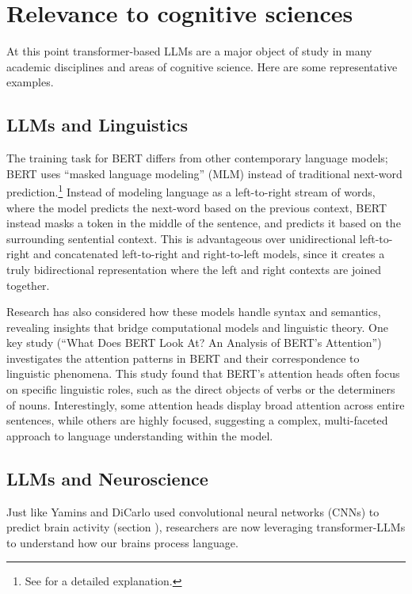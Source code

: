 \section{Relevance to cognitive sciences}\label{sect_bert}

At this point transformer-based LLMs are a major object of study in many academic disciplines and areas of cognitive science. Here are some representative examples.

\subsection{LLMs and Linguistics}

The training task for BERT differs from other contemporary language models; BERT uses ``masked language modeling'' (MLM) instead of traditional next-word prediction.\footnote{See \cite{devlin2018bert} for a detailed explanation.} Instead of modeling language as a left-to-right stream of words, where the model predicts the next-word based on the previous context, BERT instead masks a token in the middle of the sentence, and predicts it based on the surrounding sentential context. This is advantageous over unidirectional left-to-right and concatenated left-to-right and right-to-left models, since it creates a truly bidirectional representation where the left and right contexts are joined together.

Research has also considered how these models handle syntax and semantics, revealing insights that bridge computational models and linguistic theory. One key study (``What Does BERT Look At? An Analysis of BERT's Attention'') investigates the attention patterns in BERT and their correspondence to linguistic phenomena. This study found that BERT's attention heads often focus on specific linguistic roles, such as the direct objects of verbs or the determiners of nouns. Interestingly, some attention heads display broad attention across entire sentences, while others are highly focused, suggesting a complex, multi-faceted approach to language understanding within the model. 

\subsection{LLMs and Neuroscience}

Just like Yamins and DiCarlo used convolutional neural networks (CNNs) to predict brain activity (section ), researchers are now leveraging transformer-LLMs to understand how our brains process language. 

